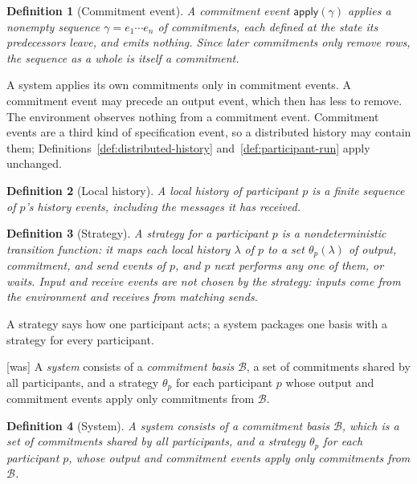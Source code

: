 \documentclass[sigconf]{cidr-2027}
\newtheorem{definition}{Definition}
\theoremstyle{remark}
\newcommand{\commitment}{commitment\xspace}
\newcommand{\commitments}{commitments\xspace}
\newcommand{\Commitment}{Commitment\xspace}
\begin{document}
\begin{definition}[\Commitment event]
\label{def:commitment-event}
A \emph{\commitment event} $\mathsf{apply}(\gamma)$ applies a nonempty
sequence $\gamma=e_1\cdots e_n$ of \commitments, each defined at the state
its predecessors leave, and emits nothing.  Since later \commitments only
remove rows, the sequence as a whole is itself a \commitment.
\end{definition}

A system applies its own \commitments only in \commitment events.  A \commitment event may precede an output event, which then
has less to remove.  The environment observes nothing from a \commitment event.
\Commitment events are a third kind of specification event, so a distributed
history may contain them; Definitions~\ref{def:distributed-history} and~\ref{def:participant-run} apply
unchanged.

\begin{definition}[Local history]
\label{def:local-history}
A \emph{local history} of participant $p$ is a finite sequence of $p$'s
history events, including the messages it has received.
\end{definition}

\begin{definition}[Strategy]
\label{def:strategy}
A \emph{strategy} for a participant $p$ is a nondeterministic transition
function: it maps each local history $\lambda$ of $p$ to a set
$\theta_p(\lambda)$ of output, \commitment, and send events of $p$, and $p$ next
performs any one of them, or waits.  Input and receive events are not chosen
by the strategy: inputs come from the environment and receives from matching
sends.
\end{definition}

A strategy says how one participant acts; a system packages one basis with
a strategy for every participant.



{\footnotesize\color{black!50}\noindent\textsf{[was]} A \emph{system} consists of a \emph{\commitment basis} $\mathcal B$, a set
of \commitments shared by all participants, and a strategy $\theta_p$ for
each participant $p$ whose output and \commitment events apply only
\commitments from $\mathcal B$.\par}

\color{blue!70!black}\begin{definition}[System]
\label{def:system}
A \emph{system} consists of a \emph{\commitment basis} $\mathcal B$, which
is a set of \commitments shared by all participants, and a strategy $\theta_p$
for each participant $p$, whose output and \commitment events apply only
\commitments from $\mathcal B$.\color{black}
\end{definition}
\end{document}
